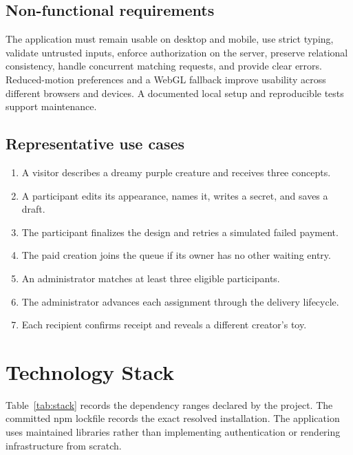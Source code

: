 \documentclass[11pt,a4paper]{article}
\begin{document}
\subsection{Non-functional requirements}
The application must remain usable on desktop and mobile, use strict typing, validate untrusted inputs, enforce authorization on the server, preserve relational consistency, handle concurrent matching requests, and provide clear errors. Reduced-motion preferences and a WebGL fallback improve usability across different browsers and devices. A documented local setup and reproducible tests support maintenance.

\subsection{Representative use cases}
\begin{enumerate}
  \item A visitor describes a dreamy purple creature and receives three concepts.
  \item A participant edits its appearance, names it, writes a secret, and saves a draft.
  \item The participant finalizes the design and retries a simulated failed payment.
  \item The paid creation joins the queue if its owner has no other waiting entry.
  \item An administrator matches at least three eligible participants.
  \item The administrator advances each assignment through the delivery lifecycle.
  \item Each recipient confirms receipt and reveals a different creator's toy.
\end{enumerate}

\section{Technology Stack}

Table~\ref{tab:stack} records the dependency ranges declared by the project. The committed npm lockfile records the exact resolved installation. The application uses maintained libraries rather than implementing authentication or rendering infrastructure from scratch.
\end{document}
